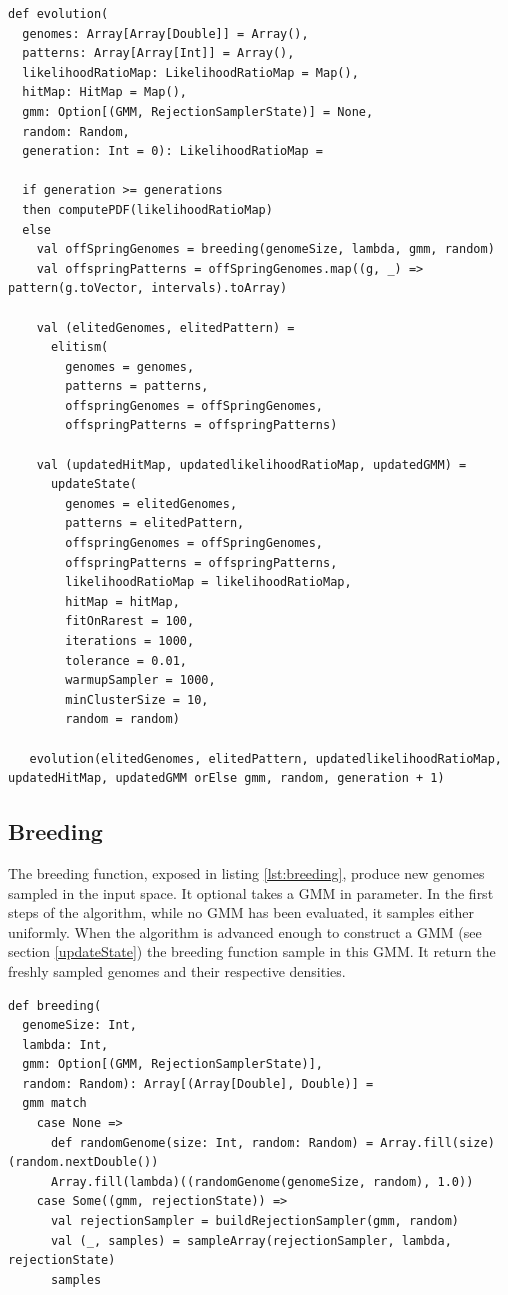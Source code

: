 \documentclass[10pt,a4paper]{article}
\theoremstyle{definition}
\theoremstyle{remark}
\begin{document}
\begin{lstlisting}[caption={Evolution Loop},label={lst:loop}]
def evolution(
  genomes: Array[Array[Double]] = Array(),
  patterns: Array[Array[Int]] = Array(),
  likelihoodRatioMap: LikelihoodRatioMap = Map(),
  hitMap: HitMap = Map(),
  gmm: Option[(GMM, RejectionSamplerState)] = None,
  random: Random,
  generation: Int = 0): LikelihoodRatioMap =

  if generation >= generations
  then computePDF(likelihoodRatioMap)
  else
    val offSpringGenomes = breeding(genomeSize, lambda, gmm, random)
    val offspringPatterns = offSpringGenomes.map((g, _) => pattern(g.toVector, intervals).toArray)

    val (elitedGenomes, elitedPattern) =
      elitism(
        genomes = genomes, 
        patterns = patterns, 
        offspringGenomes = offSpringGenomes, 
        offspringPatterns = offspringPatterns)

    val (updatedHitMap, updatedlikelihoodRatioMap, updatedGMM) =
      updateState(
        genomes = elitedGenomes,
        patterns = elitedPattern,
        offspringGenomes = offSpringGenomes,
        offspringPatterns = offspringPatterns,
        likelihoodRatioMap = likelihoodRatioMap,
        hitMap = hitMap,
        fitOnRarest = 100,
        iterations = 1000,
        tolerance = 0.01,
        warmupSampler = 1000,
        minClusterSize = 10,
        random = random)

   evolution(elitedGenomes, elitedPattern, updatedlikelihoodRatioMap, updatedHitMap, updatedGMM orElse gmm, random, generation + 1)
\end{lstlisting}


\subsection{Breeding}

The breeding function, exposed in listing \ref{lst:breeding}, produce new genomes sampled in the input space. It optional takes a GMM in parameter. In the first steps of the algorithm, while no GMM has been evaluated, it samples either uniformly. When the algorithm is advanced enough to construct a GMM (see section \ref{updateState}) the breeding function sample in this GMM. It return the freshly sampled genomes and their respective densities. 

\begin{lstlisting}[caption={Breeding},label={lst:breeding}]
def breeding(
  genomeSize: Int,
  lambda: Int,
  gmm: Option[(GMM, RejectionSamplerState)],
  random: Random): Array[(Array[Double], Double)] =
  gmm match
    case None =>
      def randomGenome(size: Int, random: Random) = Array.fill(size)(random.nextDouble())
      Array.fill(lambda)((randomGenome(genomeSize, random), 1.0))
    case Some((gmm, rejectionState)) =>
      val rejectionSampler = buildRejectionSampler(gmm, random)
      val (_, samples) = sampleArray(rejectionSampler, lambda, rejectionState)
      samples
\end{lstlisting}
\end{document}
